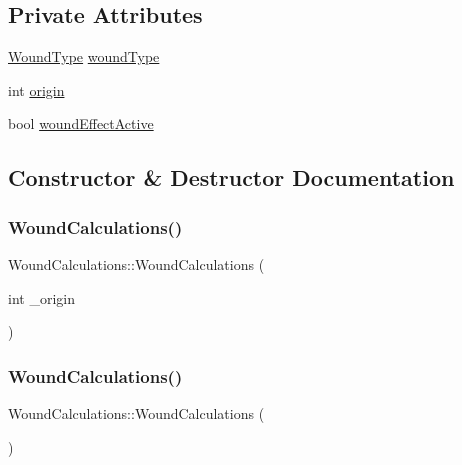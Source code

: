 \subsection*{Private Attributes}
\begin{DoxyCompactItemize}
\item 
\mbox{\hyperlink{_enum_types_8hpp_a585daaeecd1f9f1350c24bf0081a734e}{Wound\+Type}} \mbox{\hyperlink{class_wound_calculations_acc032de2c8997651ef0ee68eeb5da8ff}{wound\+Type}}
\item 
int \mbox{\hyperlink{class_wound_calculations_add854b0079ebf67f8a7fb80b7acfd812}{origin}}
\item 
bool \mbox{\hyperlink{class_wound_calculations_a172749c15d2f25d3b008a3ea7b16420d}{wound\+Effect\+Active}}
\end{DoxyCompactItemize}


\subsection{Constructor \& Destructor Documentation}
\mbox{\label{class_wound_calculations_ab315bd7c8a63f7bc479da6300ac822b5}} 
\subsubsection{\texorpdfstring{Wound\+Calculations()}{WoundCalculations()}\hspace{0.1cm}{\footnotesize\ttfamily [1/3]}}
{\footnotesize\ttfamily Wound\+Calculations\+::\+Wound\+Calculations (\begin{DoxyParamCaption}\item[{int}]{\+\_\+origin }\end{DoxyParamCaption})}

\mbox{\label{class_wound_calculations_a135735ed4b97107e6d904538d37428b0}} 
\subsubsection{\texorpdfstring{Wound\+Calculations()}{WoundCalculations()}\hspace{0.1cm}{\footnotesize\ttfamily [2/3]}}
{\footnotesize\ttfamily Wound\+Calculations\+::\+Wound\+Calculations (\begin{DoxyParamCaption}{ }\end{DoxyParamCaption})}

